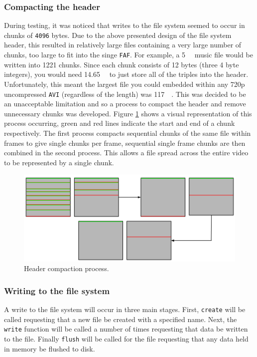 \documentclass[paper=a4, fontsize=11pt,twoside]{scrartcl}
\numberwithin{table}{section}
\numberwithin{figure}{section}
\numberwithin{algorithm}{section}
\begin{document}
\subsubsection{Compacting the header}

During testing, it was noticed that writes to the file system seemed to occur in chunks of \texttt{4096} bytes. Due to the above presented design of the file system header, this resulted in relatively large files containing a very large number of chunks, too large to fit into the singe \texttt{FAF}. For example, a \SI{5}{\mega\byte} music file would be written into 1221 chunks. Since each chunk consists of 12 bytes (three 4 byte integers), you would need \SI{14.65}{\kilo\byte} to just store all of the triples into the header. Unfortunately, this meant the largest file you could embedded within any 720p uncompressed \texttt{AVI} (regardless of the length) was \SI{117}{\mega\byte}. This was decided to be an unacceptable limitation and so a process to compact the header and remove unnecessary chunks was developed. Figure \ref{compact} shows a visual representation of this process occurring, green and red lines indicate the start and end of a chunk respectively. The first process compacts sequential chunks of the same file within frames to give single chunks per frame, sequential single frame chunks are then combined in the second process. This allows a file spread across the entire video to be represented by a single chunk.

\begin{figure}[!h]
\centerline{\includegraphics[width=\textwidth]{images/compact.png}}
\caption{Header compaction process.}
\label{compact}
\end{figure}

\subsubsection{Writing to the file system}

A write to the file system will occur in three main stages. First, \texttt{create} will be called requesting that a new file be created with a specified name. Next, the \texttt{write} function will be called a number of times requesting that data be written to the file. Finally \texttt{flush} will be called for the file requesting that any data held in memory be flushed to disk.
\end{document}
